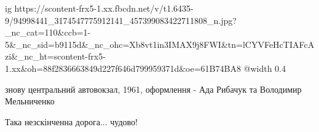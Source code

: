  
 
 
 
 

\ifcmt
  ig https://scontent-frx5-1.xx.fbcdn.net/v/t1.6435-9/94998441_3174547775912141_457399083422711808_n.jpg?_nc_cat=110&ccb=1-5&_nc_sid=b9115d&_nc_ohc=Xb8vt1in3IMAX9j8FWI&tn=lCYVFeHcTIAFcAzi&_nc_ht=scontent-frx5-1.xx&oh=88f2836663849d227f646d799959371d&oe=61B74BA8
  @width 0.4
\fi


знову центральний автовокзал, 1961, оформлення - Ада Рибачук та Володимир
Мельниченко

Така незскінченна дорога... чудово!
